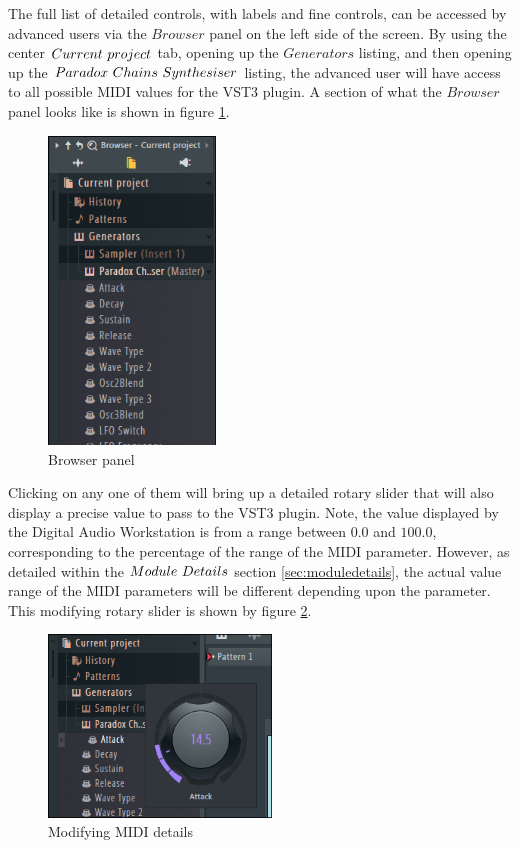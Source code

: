 \documentclass[a4paper,12pt]{report}
\begin{document}
The full list of detailed controls, with labels and fine controls, can be accessed by advanced users via the $Browser$ panel on the left side of the screen. By using the center $Current\ \-project$ tab, opening up the $Generators$ listing, and then opening up the $Paradox\ \-Chains\ \-Synthesiser$ listing, the advanced user will have access to all possible MIDI values for the VST3 plugin. A section of what the $Browser$ panel looks like is shown in figure \ref{fig:browserpanel}.

\begin{figure}[h] \centering
\includegraphics[width=12em]{BrowserPanel2.png}
    \caption{Browser panel}     \label{fig:browserpanel} \end{figure}

Clicking on any one of them will bring up a detailed rotary slider that will also display a precise value to pass to the VST3 plugin. Note, the value displayed by the Digital Audio Workstation is from a range between $0.0$ and $100.0$, corresponding to the percentage of the range of the MIDI parameter. However, as detailed within the $Module\ \-Details$ section \ref{sec:moduledetails}, the actual value range of the MIDI parameters will be different depending upon the parameter. This modifying rotary slider is shown by figure \ref{fig:ModifyingDetailedMIDI}.

\begin{figure}[h]
\centering
\includegraphics[width=16em]{ModifyingDetailedMIDI.png}
    \caption{Modifying MIDI details}     \label{fig:ModifyingDetailedMIDI}
\end{figure}
\end{document}
